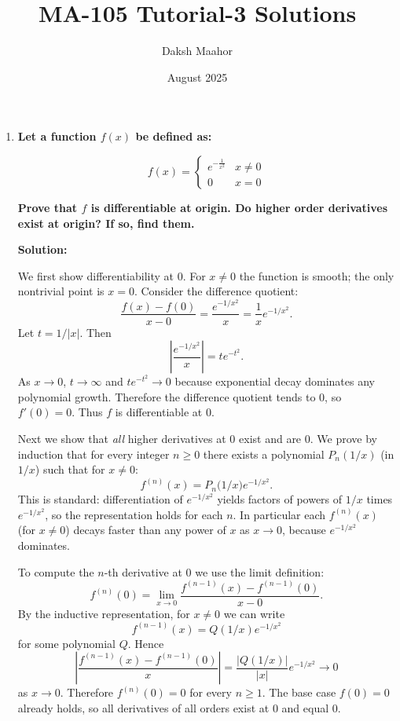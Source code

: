 \documentclass[14pt]{extarticle}
\title{\vspace{-3cm}MA-105 Tutorial-3 Solutions}
\author{Daksh Maahor}
\date{August 2025}
\begin{document}
\maketitle

\bigskip

\begin{enumerate}

\item \textbf{Let a function $f(x)$ be defined as: }

\[
f(x) = \begin{cases}
e^{-\frac{1}{x^2}} & x \neq 0 \\
0 & x = 0
\end{cases}
\]

\textbf{Prove that $f$ is differentiable at origin. Do higher order derivatives exist at origin? If so, find them.}

\textbf{Solution:}

We first show differentiability at $0$. For $x\neq 0$ the function is smooth; the only nontrivial point is $x=0$. Consider the difference quotient:
\[
\frac{f(x)-f(0)}{x-0}=\frac{e^{-1/x^2}}{x}=\frac{1}{x}e^{-1/x^2}.
\]
Let $t=1/|x|$. Then
\[
\left|\frac{e^{-1/x^2}}{x}\right|=t e^{-t^2}.
\]
As $x\to 0$, $t\to \infty$ and $t e^{-t^2}\to 0$ because exponential decay dominates any polynomial growth. Therefore the difference quotient tends to $0$, so $f'(0)=0$. Thus $f$ is differentiable at $0$.

Next we show that \emph{all} higher derivatives at $0$ exist and are $0$. We prove by induction that for every integer $n\ge 0$ there exists a polynomial $P_n(1/x)$ (in $1/x$) such that for $x\neq0$:
\[
f^{(n)}(x) = P_n\bigl(1/x\bigr) e^{-1/x^2}.
\]
This is standard: differentiation of $e^{-1/x^2}$ yields factors of powers of $1/x$ times $e^{-1/x^2}$, so the representation holds for each $n$. In particular each $f^{(n)}(x)$ (for $x\neq0$) decays faster than any power of $x$ as $x\to0$, because $e^{-1/x^2}$ dominates.

To compute the $n$-th derivative at $0$ we use the limit definition:
\[
f^{(n)}(0)=\lim_{x\to0}\frac{f^{(n-1)}(x)-f^{(n-1)}(0)}{x-0}.
\]
By the inductive representation, for $x\neq0$ we can write
\[
f^{(n-1)}(x)=Q(1/x)e^{-1/x^2}
\]
for some polynomial $Q$. Hence
\[
\left|\frac{f^{(n-1)}(x)-f^{(n-1)}(0)}{x}\right|=\frac{|Q(1/x)|}{|x|}e^{-1/x^2} \to 0
\]
as $x\to0$. Therefore $f^{(n)}(0)=0$ for every $n\ge1$. The base case $f(0)=0$ already holds, so all derivatives of all orders exist at $0$ and equal $0$.


\end{enumerate}
\end{document}
